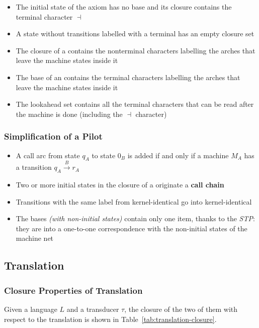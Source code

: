 \documentclass[english]{article}
\begin{document}
\begin{itemize}
  \item The initial state of the axiom has no base and its closure contains the terminal character \(\dashv\)
  \item A state without transitions labelled with a terminal has an empty closure set
  \item The closure of a \mstate contains the nonterminal characters labelling the arches that leave the machine states inside it
  \item The base of an \mstate contains the terminal characters labelling the arches that leave the machine states inside it
  \item The lookahead set contains all the terminal characters that can be read after the machine is done (including the \(\dashv\) character)
\end{itemize}

\subsubsection[Simplification of a ELL(1) Pilot]{Simplification of a \ello Pilot}

\begin{itemize}
  \item A call arc from state \(q_A\) to state \(0_B\) is added if and only if a machine \(M_A\) has a transition \(q_A \xrightarrow{B} r_A\)
  \item Two or more initial states in the closure of a \mstate originate a \textbf{call chain}
  \item Transitions with the same label from kernel-identical \mstates go into kernel-identical \mstates
  \item The \mstate bases \textit{(with non-initial states)} contain only one item, thanks to the \textit{STP}: they are into a one-to-one correspondence with the non-initial states of the machine net
\end{itemize}

\subsection{Translation}

\subsubsection{Closure Properties of Translation}

Given a language \(L\) and a transducer \(\tau\), the closure of the two of them with respect to the translation is shown in Table~\ref{tab:translation-closure}.
\end{document}
